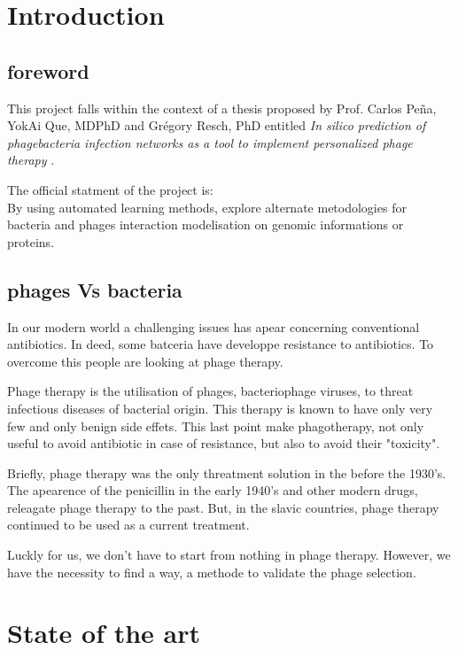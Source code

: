 \documentclass[a4paper,11pt]{report}
\begin{document}
\tableofcontents


\chapter{Introduction}
\section{foreword}
This project falls within the context of a thesis proposed by Prof. Carlos Peña, YokAi
Que, MDPhD and Grégory Resch, PhD entitled \textit{In silico prediction of phagebacteria
infection networks as a tool to implement personalized phage therapy} \cite{ref1}.

The official statment of the project is:\\
By using automated learning methods, explore alternate metodologies for bacteria and phages interaction modelisation on genomic informations or proteins.


\section{phages Vs bacteria}
In our modern world a challenging issues has apear concerning conventional antibiotics. In deed, some batceria have developpe resistance to antibiotics. To overcome this people are looking at phage therapy. 

Phage therapy is the utilisation of phages, bacteriophage viruses, to threat infectious diseases of bacterial origin. This therapy is known to have only very few and only benign side effets. This last point make phagotherapy, not only useful to avoid antibiotic in case of resistance, but also to avoid their "toxicity".

Briefly, phage therapy was the only threatment solution in the before the 1930's. The apearence of the penicillin in the early 1940's and other modern drugs, releagate phage therapy to the past. But, in the slavic countries, phage therapy continued to be used as a current treatment.

Luckly for us, we don't have to start from nothing in phage therapy. However, we have the necessity to find a way, a methode to validate the phage selection.

\cite{ref2}




\chapter{State of the art}
\end{document}
